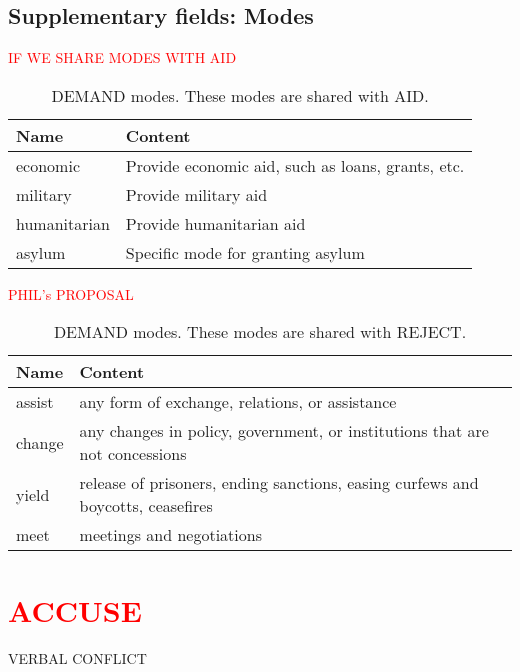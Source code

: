 \documentclass[11pt]{report}
\newcommand{\andy}[1]{\textcolor{red}{#1}}
\begin{document}
\subsection{Supplementary fields: Modes}

\andy{IF WE SHARE MODES WITH AID}

\begin{table}[htp]
\color{red}
\caption{DEMAND modes. These modes are shared with AID.}
\begin{center}
\begin{tabular}{|l|p{13cm}|}
\hline
Name & Content \\
\hline
economic & Provide economic aid, such as loans, grants, etc.\\
military & Provide military aid \\
humanitarian & Provide humanitarian aid \\
asylum & Specific mode for granting asylum\\
\hline
\end{tabular}
\end{center}
\label{tab:demandmode}
\end{table}%

\andy{PHIL's PROPOSAL}

\begin{table}[htp]
\color{red}
\caption{DEMAND modes. These modes are shared with REJECT.}
\begin{center}
\begin{tabular}{|l|p{13cm}|}
\hline
Name & Content \\
\hline
assist & any form of exchange, relations, or assistance\\
change & any changes in policy, government, or institutions that are not concessions \\
yield & release of prisoners, ending sanctions, easing curfews and boycotts, ceasefires\\
meet & meetings and negotiations\\
\hline
\end{tabular}
\end{center}
\label{tab:demandmode2}
\end{table}%

\newpage  


\section{\andy{ACCUSE}}

\textsf{VERBAL CONFLICT} \vspace{8pt}
\end{document}
